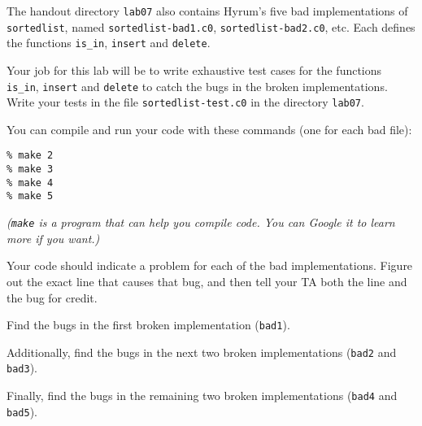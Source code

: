 The handout directory \lstinline'lab07' also contains Hyrum's five bad
implementations of \lstinline'sortedlist', named
\lstinline'sortedlist-bad1.c0', \lstinline'sortedlist-bad2.c0', etc.
Each defines the functions \lstinline'is_in', \lstinline'insert' and
\lstinline'delete'.

Your job for this lab will be to write exhaustive test cases for the
functions \lstinline'is_in', \lstinline'insert' and \lstinline'delete'
to catch the bugs in the broken implementations.  Write your tests in
the file \lstinline|sortedlist-test.c0| in the directory
\lstinline|lab07|.

You can compile and run your code with these commands (one for each bad file):
\begin{lstlisting}[language={[coin]C}, belowskip=0pt]
% make 1
% make 2
% make 3
% make 4
% make 5
\end{lstlisting}
\emph{(\lstinline'make' is a program that can help you compile
  code. You can Google it to learn more if you want.)}

Your code should indicate a problem for each of the bad
implementations. Figure out the exact line that causes that bug, and
then tell your TA both the line and the bug for credit.

\begin{part}\onePT[2.5ex]
  Find the bugs in the first broken implementation (\lstinline'bad1').
\end{part}

\begin{part}\twoPT[2.5ex]
  Additionally, find the bugs in the next two broken implementations
  (\lstinline'bad2' and \lstinline'bad3').
\end{part}

\begin{part}\threePT[2.5ex]
  Finally, find the bugs in the remaining two broken implementations
  (\lstinline'bad4' and \lstinline'bad5').
\end{part}

